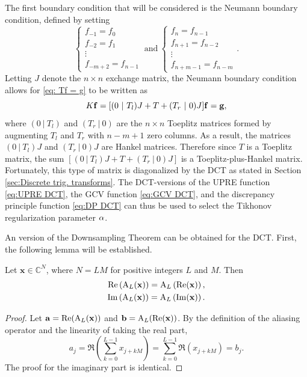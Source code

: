 The first boundary condition that will be considered is the Neumann boundary condition, defined by setting
\[\begin{cases}
f_{-1} = f_0 \\
f_{-2} = f_1 \\
\vdots \\
f_{-m+2} = f_{n-1}
\end{cases} ~ \text{and} ~
\begin{cases}
f_{n} = f_{n-1} \\
f_{n+1} = f_{n-2} \\
\vdots \\
f_{n+m-1} = f_{n-m}
\end{cases}.\]
Letting $J$ denote the $n \times n$ exchange matrix, the Neumann boundary condition allows for \eqref{eq: Tf = g} to be written as
\begin{equation}
\label{eq:Neumann Kf = g}
K\mathbf{f} = [(0~|~T_{l})J + T + (T_{r}~|~0)J]\mathbf{f} = \mathbf{g},
\end{equation}
where $(0~|~T_{l})$ and $(T_{r}~|~0)$ are the $n \times n$ Toeplitz matrices formed by augmenting $T_{l}$ and $T_{r}$ with $n-m+1$ zero columns. As a result, the matrices $(0~|~T_{l})J$ and $(T_{r}~|~0)J$ are Hankel matrices. Therefore since $T$ is a Toeplitz matrix, the sum $[(0~|~T_{l})J + T + (T_{r}~|~0)J]$ is a Toeplitz-plus-Hankel matrix. Fortunately, this type of matrix is diagonalized by the DCT as stated in Section \ref{sec:Discrete trig. transforms}. The DCT-versions of the UPRE function \eqref{eq:UPRE DCT}, the GCV function \eqref{eq:GCV DCT}, and the discrepancy principle function \eqref{eq:DP DCT} can thus be used to select the Tikhonov regularization parameter $\alpha$. \par 
An version of the Downsampling Theorem can be obtained for the DCT. First, the following lemma will be established.
\begin{lemma}
Let $\mathbf{x} \in \mathbb{C}^N$, where $N = LM$ for positive integers $L$ and $M$. Then
\begin{align*}
\operatorname{Re}\left(\operatorname{A}_L(\mathbf{x})\right) = \operatorname{A}_L\left(\operatorname{Re}(\mathbf{x})\right), \\
\operatorname{Im}\left(\operatorname{A}_L(\mathbf{x})\right) = \operatorname{A}_L\left(\operatorname{Im}(\mathbf{x})\right).
\end{align*}
\end{lemma}
\begin{proof}
Let $\mathbf{a} = \operatorname{Re}(\operatorname{A}_L(\mathbf{x}))$ and $\mathbf{b} = \operatorname{A}_L(\operatorname{Re}(\mathbf{x}))$. By the definition of the aliasing operator and the linearity of taking the real part,
\[a_j = \Re\left(\sum_{k=0}^{L-1} x_{j+kM}\right) = \sum_{k=0}^{L-1} \Re(x_{j+kM}) = b_j.\]
The proof for the imaginary part is identical.
\end{proof}


